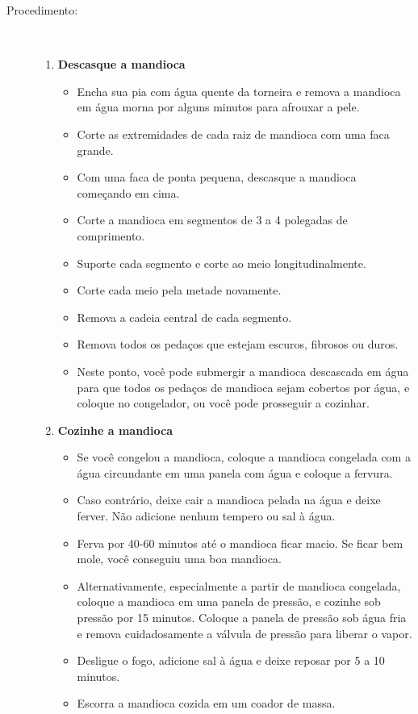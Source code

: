 \documentclass [11pt, letterpaper] {article}
\begin{document}
\begin {description}
\item [Procedimento:] \ \\
\begin {enumerate}
\item {\bf Descasque a mandioca}
\begin {itemize}
\item Encha sua pia com água quente da torneira e remova a mandioca em água morna por alguns minutos para afrouxar a pele.
\item Corte as extremidades de cada raiz de mandioca com uma faca grande.
\item Com uma faca de ponta pequena, descasque a mandioca começando em cima.
\item Corte a mandioca em segmentos de 3 a 4 polegadas de comprimento.
\item Suporte cada segmento e corte ao meio longitudinalmente.
\item Corte cada meio pela metade novamente.
\item Remova a cadeia central de cada segmento.
\item Remova todos os peda\c{c}os que estejam escuros, fibrosos ou duros.
\item Neste ponto, você pode submergir a mandioca descascada em água para que todos os pedaços de mandioca sejam cobertos por água, e coloque no congelador, ou você pode prosseguir a cozinhar.
\end {itemize}
\item {\bf Cozinhe a mandioca}
\begin {itemize}
\item Se você congelou a mandioca, coloque a mandioca congelada com a água circundante em uma panela com água  e coloque a fervura.
\item Caso contrário, deixe cair a mandioca pelada na água e deixe ferver. Não adicione nenhum tempero ou sal à água.
\item Ferva por 40-60 minutos até o mandioca ficar macio. Se ficar bem mole, você conseguiu uma boa mandioca.
\item Alternativamente, especialmente a partir de mandioca congelada, coloque a mandioca em uma panela de pressão, e cozinhe sob pressão por 15 minutos. Coloque a panela de pressão sob água fria e remova cuidadosamente a válvula de pressão para liberar o vapor.
\item Desligue o fogo, adicione sal à água e deixe reposar por 5 a 10 minutos.
\item Escorra a mandioca cozida em um coador de massa.

\end{itemize}
\end{enumerate}
\end{description}
\end{document}
